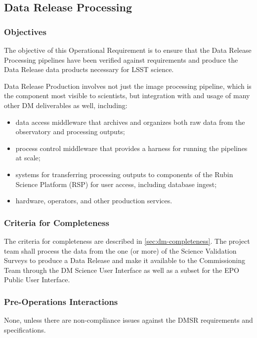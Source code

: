 \subsection{Data Release Processing}

\subsubsection{Objectives}
The objective of this Operational Requirement is to ensure that the Data Release Processing pipelines have been verified against requirements  and produce the Data Release data products necessary for LSST science.

Data Release Production involves not just the image processing pipeline,  which is the component most visible to scientists, but integration with and usage of many other DM deliverables as well, including:
\begin{itemize}
\item data access middleware that archives and organizes both raw data from the observatory and processing outputs;
\item process control middleware that provides a harness for running the pipelines at scale;
\item systems for transferring processing outputs to components of the Rubin Science Platform (RSP) for user access, including database ingest;
\item hardware, operators, and other production services.
\end{itemize}

\subsubsection{Criteria for Completeness}
The criteria for completeness are described in \ref{sec:dm-completeness}.
The project team shall process the data from the one (or more) of the Science Validation Surveys to produce a Data Release and make it available to the Commissioning Team through the DM Science User Interface as well as a subset for the EPO Public User Interface.

\subsubsection{Pre-Operations Interactions}
None, unless there are non-compliance issues against the DMSR requirements and specifications.

